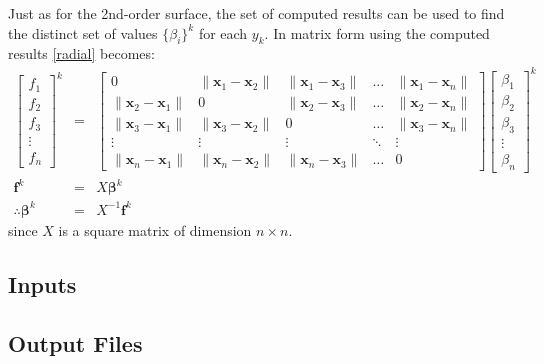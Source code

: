 Just as for the 2nd-order surface, the set of computed results can be used to find the distinct set of values $\lbrace \beta_i \rbrace^k$ for each $y_k$. In matrix form using the computed results \cref{radial} becomes:
\begin{eqnarray}
\begin{bmatrix} f_1 \\ f_2 \\ f_3 \\ \vdots \\ f_n \end{bmatrix}^k &=& \begin{bmatrix} 0 & \parallel\mathbf{x}_1-\mathbf{x}_2\parallel & \parallel\mathbf{x}_1-\mathbf{x}_3\parallel & \dots & \parallel\mathbf{x}_1-\mathbf{x}_n\parallel \\ \parallel\mathbf{x}_2-\mathbf{x}_1\parallel & 0 & \parallel\mathbf{x}_2-\mathbf{x}_3\parallel & \dots & \parallel\mathbf{x}_2-\mathbf{x}_n\parallel \\ \parallel\mathbf{x}_3-\mathbf{x}_1\parallel & \parallel\mathbf{x}_3-\mathbf{x}_2\parallel & 0 & \dots & \parallel\mathbf{x}_3-\mathbf{x}_n\parallel \\ \vdots & \vdots & \vdots & \ddots & \vdots \\ \parallel\mathbf{x}_n-\mathbf{x}_1\parallel & \parallel\mathbf{x}_n-\mathbf{x}_2\parallel & \parallel\mathbf{x}_n-\mathbf{x}_3\parallel & \dots & 0 \end{bmatrix} \begin{bmatrix} \beta_1 \\ \beta_2 \\ \beta_3 \\ \vdots \\ \beta_n \end{bmatrix}^k \\
\mathbf{f}^k &=& X \boldsymbol{\beta}^k \nonumber \\
\therefore \boldsymbol{\beta}^k &=& X^{-1}\mathbf{f}^k 
\end{eqnarray}
since $X$ is a square matrix of dimension $n\times n$.

\subsection{Inputs}

\subsection{Output Files}